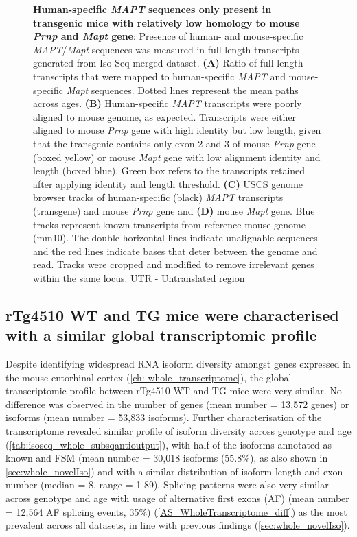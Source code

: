 \begin{figure}[htp]
	{\textbf{Human-specific \textit{MAPT} sequences only present in transgenic mice with relatively low homology to mouse \textit{Prnp} and \textit{Mapt} gene}: Presence of human- and mouse-specific \textit{MAPT}/\textit{Mapt} sequences was measured in full-length transcripts generated from Iso-Seq merged dataset. \textbf{(A)} Ratio of full-length transcripts that were mapped to human-specific \textit{MAPT} and mouse-specific \textit{Mapt} sequences. Dotted lines represent the mean paths across ages. \textbf{(B)} Human-specific \textit{MAPT} transcripts were poorly aligned to mouse genome, as expected. Transcripts were either aligned to mouse \textit{Prnp} gene with high identity but low length, given that the transgenic contains only exon 2 and 3 of mouse \textit{Prnp} gene\cite{Ramsden2005} (boxed yellow) or  mouse \textit{Mapt} gene with low alignment identity and length (boxed blue). Green box refers to the transcripts retained after applying identity and length threshold. \textbf{(C)} USCS genome browser tracks of human-specific (black) \textit{MAPT} transcripts (transgene) and mouse \textit{Prnp} gene and \textbf{(D)} mouse \textit{Mapt} gene. Blue tracks represent known transcripts from reference mouse genome (mm10). The double horizontal lines indicate unalignable sequences and the red lines indicate bases that deter between the genome and read. Tracks were cropped and modified to remove irrelevant genes within the same locus.  UTR - Untranslated region}
	\label{fig:isoseq_humanmapt}
\end{figure}

\clearpage
\subsection{rTg4510 WT and TG mice were characterised with a similar global transcriptomic profile}
Despite identifying widespread RNA isoform diversity amongst genes expressed in the mouse entorhinal cortex (\cref{ch: whole_transcriptome}), the global transcriptomic profile between rTg4510 WT and TG mice were very similar. No difference was observed in the number of genes (mean number = 13,572 genes) or isoforms (mean number = 53,833 isoforms). Further characterisation of the transcriptome revealed similar profile of isoform diversity across genotype and age (\cref{tab:isoseq_whole_subsqantioutput}), with half of the isoforms annotated as known and FSM (mean number = 30,018 isoforms (55.8\%), as also shown in \cref{sec:whole_novelIso}) and with a similar distribution of isoform length and exon number (median = 8, range = 1-89). Splicing patterns were also very similar across genotype and age with usage of alternative first exons (AF) (mean number = 12,564 AF splicing events, 35\%) (\cref{AS_WholeTranscriptome_diff}) as the most prevalent across all datasets, in line with previous findings (\cref{sec:whole_novelIso}).

